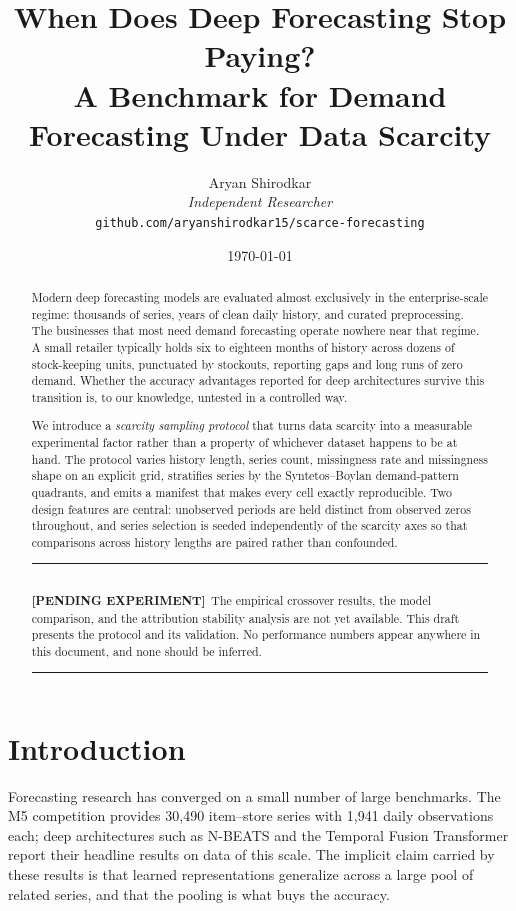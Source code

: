 \documentclass[11pt]{article}
\title{\bf When Does Deep Forecasting Stop Paying?\\
A Benchmark for Demand Forecasting Under Data Scarcity}
\author{Aryan Shirodkar\\
\normalsize \textit{Independent Researcher}\\
\normalsize \texttt{github.com/aryanshirodkar15/scarce-forecasting}}
\date{\today}
\newcommand{\gap}[1]{%
  \par\vspace{0.6em}\noindent
  \colorbox{gapbg}{%
    \parbox{\dimexpr\linewidth-2\fboxsep}{%
      \color{gaprule}\rule{\linewidth}{0.8pt}\\[0.2em]
      \textcolor{gaprule}{\textbf{[PENDING EXPERIMENT]}}\ \color{black}#1\\[0.3em]
      \color{gaprule}\rule{\linewidth}{0.8pt}}}%
  \par\vspace{0.6em}}
\begin{document}
\maketitle

\begin{abstract}
Modern deep forecasting models are evaluated almost exclusively in the
enterprise-scale regime: thousands of series, years of clean daily history, and
curated preprocessing. The businesses that most need demand forecasting operate
nowhere near that regime. A small retailer typically holds six to eighteen months
of history across dozens of stock-keeping units, punctuated by stockouts,
reporting gaps and long runs of zero demand. Whether the accuracy advantages
reported for deep architectures survive this transition is, to our knowledge,
untested in a controlled way.

We introduce a \emph{scarcity sampling protocol} that turns data scarcity into a
measurable experimental factor rather than a property of whichever dataset
happens to be at hand. The protocol varies history length, series count,
missingness rate and missingness shape on an explicit grid, stratifies series by
the Syntetos--Boylan demand-pattern quadrants, and emits a manifest that makes
every cell exactly reproducible. Two design features are central: unobserved
periods are held distinct from observed zeros throughout, and series selection is
seeded independently of the scarcity axes so that comparisons across history
lengths are paired rather than confounded.

\gap{The empirical crossover results, the model comparison, and the attribution
stability analysis are not yet available. This draft presents the protocol and
its validation. No performance numbers appear anywhere in this document, and none
should be inferred.}
\end{abstract}

\section{Introduction}

Forecasting research has converged on a small number of large benchmarks. The M5
competition \citep{makridakis2022m5} provides 30{,}490 item--store series with
1{,}941 daily observations each; deep architectures such as N-BEATS
\citep{oreshkin2020nbeats} and the Temporal Fusion Transformer
\citep{lim2021tft} report their headline results on data of this scale. The
implicit claim carried by these results is that learned representations
generalize across a large pool of related series, and that the pooling is what
buys the accuracy.
\end{document}

